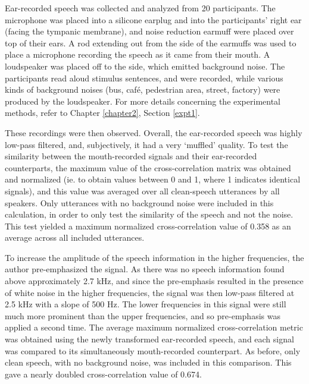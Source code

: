 Ear-recorded speech was collected and analyzed from 20 participants.  The microphone was placed into a silicone earplug and into the participants' right ear (facing the tympanic membrane), and noise reduction earmuff were placed over top of their ears.  A rod extending out from the side of the earmuffs was used to place a microphone recording the speech as it came from their mouth.  A loudspeaker was placed off to the side, which emitted background noise.  The participants read aloud stimulus sentences, and were recorded, while various kinds of background noises (bus, caf\'{e}, pedestrian area, street, factory) were produced by the loudspeaker.  For more details concerning the experimental methods, refer to Chapter \ref{chapter2}, Section \ref{expt1}.

These recordings were then observed.  Overall, the ear-recorded speech was highly low-pass filtered, and, subjectively, it had a very `muffled' quality.  To test the similarity between the mouth-recorded signals and their ear-recorded counterparts, the maximum value of the cross-correlation matrix was obtained and normalized (ie. to obtain values between 0 and 1, where 1 indicates identical signals), and this value was averaged over all clean-speech utterances by all speakers.  Only utterances with no background noise were included in this calculation, in order to only test the similarity of the speech and not the noise.  This test yielded a maximum normalized cross-correlation value of 0.358 as an average across all included utterances.

To increase the amplitude of the speech information in the higher frequencies, the author pre-emphasized the signal.  As there was no speech information found above approximately 2.7 kHz, and since the pre-emphasis resulted in the presence of white noise in the higher frequencies, the signal was then low-pass filtered at 2.5 kHz with a slope of 500 Hz.  The lower frequencies in this signal were still much more prominent than the upper frequencies, and so pre-emphasis was applied a second time.  The average maximum normalized cross-correlation metric was obtained using the newly transformed ear-recorded speech, and each signal was compared to its simultaneously mouth-recorded counterpart.  As before, only clean speech, with no background noise, was included in this comparison.  This gave a nearly doubled cross-correlation value of 0.674.


